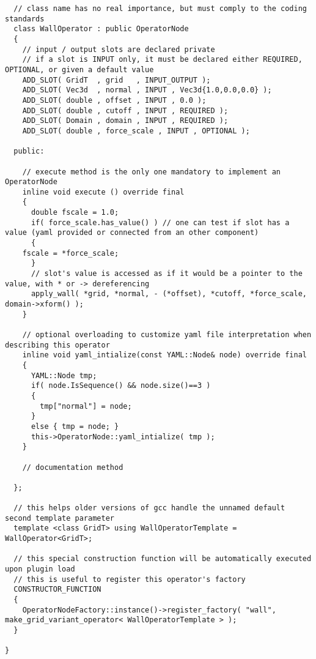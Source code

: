 \begin{lstlisting}
  // class name has no real importance, but must comply to the coding standards
  class WallOperator : public OperatorNode
  {
    // input / output slots are declared private
    // if a slot is INPUT only, it must be declared either REQUIRED, OPTIONAL, or given a default value
    ADD_SLOT( GridT  , grid   , INPUT_OUTPUT );
    ADD_SLOT( Vec3d  , normal , INPUT , Vec3d{1.0,0.0,0.0} );
    ADD_SLOT( double , offset , INPUT , 0.0 );
    ADD_SLOT( double , cutoff , INPUT , REQUIRED );
    ADD_SLOT( Domain , domain , INPUT , REQUIRED );
    ADD_SLOT( double , force_scale , INPUT , OPTIONAL );

  public:

    // execute method is the only one mandatory to implement an OperatorNode
    inline void execute () override final
    {
      double fscale = 1.0;
      if( force_scale.has_value() ) // one can test if slot has a value (yaml provided or connected from an other component)
      {
	fscale = *force_scale;
      }
      // slot's value is accessed as if it would be a pointer to the value, with * or -> dereferencing
      apply_wall( *grid, *normal, - (*offset), *cutoff, *force_scale, domain->xform() );
    }

    // optional overloading to customize yaml file interpretation when describing this operator
    inline void yaml_intialize(const YAML::Node& node) override final
    {
      YAML::Node tmp;
      if( node.IsSequence() && node.size()==3 )
      {
        tmp["normal"] = node;
      }
      else { tmp = node; }
      this->OperatorNode::yaml_intialize( tmp );
    }

    // documentation method
    
  };
  
  // this helps older versions of gcc handle the unnamed default second template parameter
  template <class GridT> using WallOperatorTemplate = WallOperator<GridT>;

  // this special construction function will be automatically executed upon plugin load
  // this is useful to register this operator's factory
  CONSTRUCTOR_FUNCTION
  {
    OperatorNodeFactory::instance()->register_factory( "wall", make_grid_variant_operator< WallOperatorTemplate > );
  }

}

\end{lstlisting}

